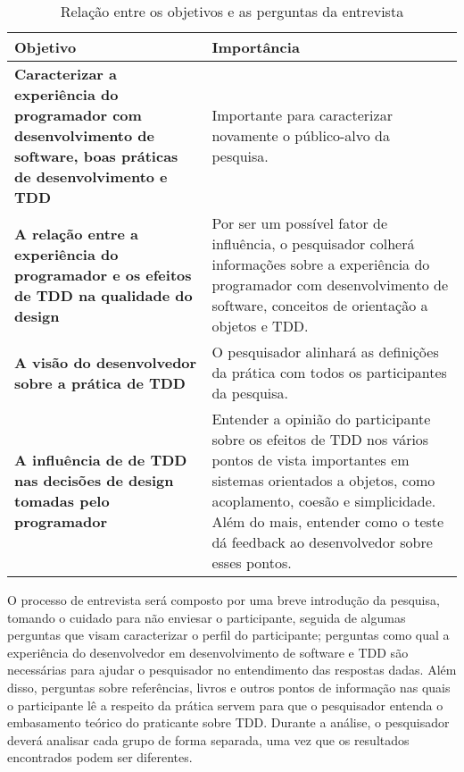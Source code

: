 \begin{table}[h!]
	\begin{tabular}{ | p{6cm} | p{7cm} | }
		\hline
		
		Objetivo & Importância \\
		
		\hline
		\textbf{Caracterizar a experiência do programador com desenvolvimento de
		software, boas práticas de desenvolvimento e TDD} 
		&
		Importante para caracterizar novamente o público-alvo da pesquisa.

		\\

		\hline
		\textbf{A relação entre a experiência do programador e os efeitos de TDD
		na qualidade do design} 
		&
		Por ser um possível fator de influência, o pesquisador colherá
		informações sobre a experiência do programador com desenvolvimento de software, 
		conceitos de orientação a objetos e TDD.

		\\

		\hline
		\textbf{A visão do desenvolvedor sobre a prática de TDD} 
		&
		O pesquisador alinhará as definições da prática com todos os participantes da
		pesquisa.

		\\

		\hline
		\textbf{A influência de de TDD nas decisões de design tomadas pelo programador} 
		&
		Entender a opinião do participante sobre os efeitos de TDD
		nos vários pontos de vista importantes em sistemas orientados a objetos, como
		acoplamento, coesão e simplicidade. Além do mais, entender como o teste
		dá feedback ao desenvolvedor sobre esses pontos.
		
		\\

		\hline												
	\end{tabular}
	\caption{Relação entre os objetivos e as perguntas da entrevista}
	\label{tab:questoes}
\end{table}

O processo de entrevista será composto por uma breve introdução da pesquisa, tomando
o cuidado para não enviesar o participante, seguida de algumas perguntas que visam
caracterizar o perfil do participante; perguntas como qual a experiência do
desenvolvedor em desenvolvimento de software e TDD são necessárias para ajudar o
pesquisador no entendimento das respostas dadas. Além disso, perguntas sobre
referências, livros e outros pontos de informação nas quais o participante lê a
respeito da prática servem para que o pesquisador entenda o embasamento teórico
do praticante sobre TDD. Durante a análise, o pesquisador deverá analisar cada
grupo de forma separada, uma vez que os resultados encontrados podem ser
diferentes.


